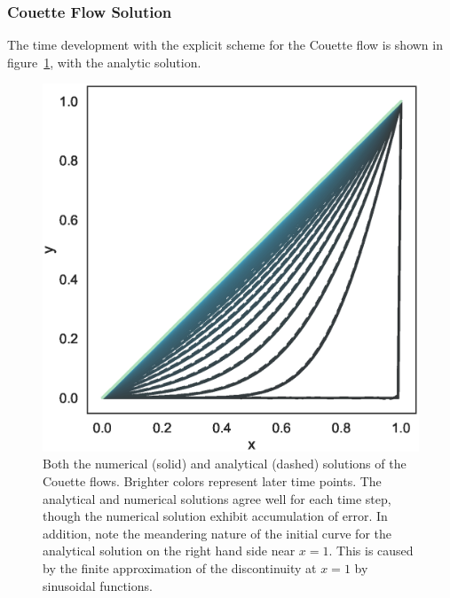 \documentclass[aps,reprint]{revtex4-1}
\begin{document}
\subsubsection{Couette Flow Solution}
The time development with the explicit scheme for the Couette flow is shown in
figure~\ref{fig:couettenumanalytic}, with the analytic solution.
\begin{figure}[ht]
  \centering
  \includegraphics[width=\columnwidth]{figures/couette_numeric_vs_analytical.eps}
  \caption{\label{fig:couettenumanalytic} Both the numerical (solid) and analytical
    (dashed) solutions of the Couette flows. Brighter colors represent later time
    points. The analytical and numerical solutions agree well for each time
    step, though the numerical solution exhibit accumulation of error. In
    addition, note the meandering nature of the initial curve for the analytical
  solution on the right hand side near \(x=1\). This is caused by the finite
  approximation of the discontinuity at \(x=1\) by sinusoidal functions. }
\end{figure}
\end{document}
